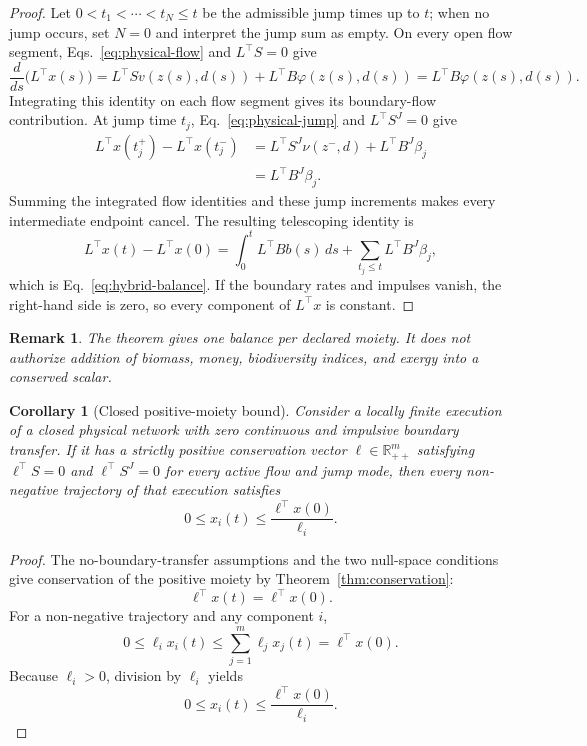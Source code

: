 \documentclass[11pt]{article}
\newtheorem{corollary}{Corollary}
\newtheorem{remark}{Remark}
\theoremstyle{definition}
\newcommand{\R}{\mathbb R}
\begin{document}
\begin{proof}
Let $0<t_1<\cdots<t_N\le t$ be the admissible jump times up to $t$; when no jump occurs, set $N=0$ and interpret the jump sum as empty. On every open flow segment, Eqs.~\eqref{eq:physical-flow} and $L^\top S=0$ give
\[
\frac{d}{ds}\bigl(L^\top x(s)\bigr)
=L^\top Sv(z(s),d(s))+L^\top B\varphi(z(s),d(s))
=L^\top B\varphi(z(s),d(s)).
\]
Integrating this identity on each flow segment gives its boundary-flow contribution. At jump time $t_j$, Eq.~\eqref{eq:physical-jump} and $L^\top S^J=0$ give
\begin{align*}
L^\top x(t_j^+)-L^\top x(t_j^-)
&=L^\top S^J\nu(z^-,d)+L^\top B^J\beta_j\\
&=L^\top B^J\beta_j.
\end{align*}
Summing the integrated flow identities and these jump increments makes every intermediate endpoint cancel. The resulting telescoping identity is
\[
L^\top x(t)-L^\top x(0)
=\int_0^tL^\top Bb(s)\,ds
 +\sum_{t_j\le t}L^\top B^J\beta_j,
\]
which is Eq.~\eqref{eq:hybrid-balance}. If the boundary rates and impulses vanish, the right-hand side is zero, so every component of $L^\top x$ is constant.
\end{proof}

\begin{remark}
The theorem gives one balance per declared moiety. It does not authorize addition of biomass, money, biodiversity indices, and exergy into a conserved scalar.
\end{remark}

\begin{corollary}[Closed positive-moiety bound]
Consider a locally finite execution of a closed physical network with zero continuous and impulsive boundary transfer. If it has a strictly positive conservation vector $\ell\in\R_{++}^m$ satisfying $\ell^\top S=0$ and $\ell^\top S^J=0$ for every active flow and jump mode, then every non-negative trajectory of that execution satisfies
\[
0\le x_i(t)\le\frac{\ell^\top x(0)}{\ell_i}.
\]
\end{corollary}

\begin{proof}
The no-boundary-transfer assumptions and the two null-space conditions give conservation of the positive moiety by Theorem~\ref{thm:conservation}:
\[
\ell^\top x(t)=\ell^\top x(0).
\]
For a non-negative trajectory and any component $i$,
\[
0\le \ell_i x_i(t)
\le\sum_{j=1}^m\ell_jx_j(t)
=\ell^\top x(0).
\]
Because $\ell_i>0$, division by $\ell_i$ yields
\[
0\le x_i(t)\le\frac{\ell^\top x(0)}{\ell_i}.
\]
\end{proof}
\end{document}
